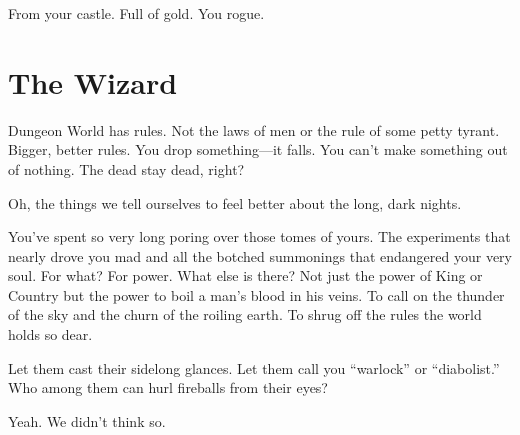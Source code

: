          

From your castle. Full of gold. You rogue.

         
\section{The Wizard}   
         

Dungeon World has rules. Not the laws of men or the rule of some petty tyrant. Bigger, better rules. You drop something—it falls. You can’t make something out of nothing. The dead stay dead, right?

         

Oh, the things we tell ourselves to feel better about the long, dark nights.

         

You’ve spent so very long poring over those tomes of yours. The experiments that nearly drove you mad and all the botched summonings that endangered your very soul. For what? For power. What else is there? Not just the power of King or Country but the power to boil a man's blood in his veins. To call on the thunder of the sky and the churn of the roiling earth. To shrug off the rules the world holds so dear.

         

Let them cast their sidelong glances. Let them call you “warlock” or “diabolist.” Who among them can hurl fireballs from their eyes?

         

Yeah. We didn’t think so.

       

       
